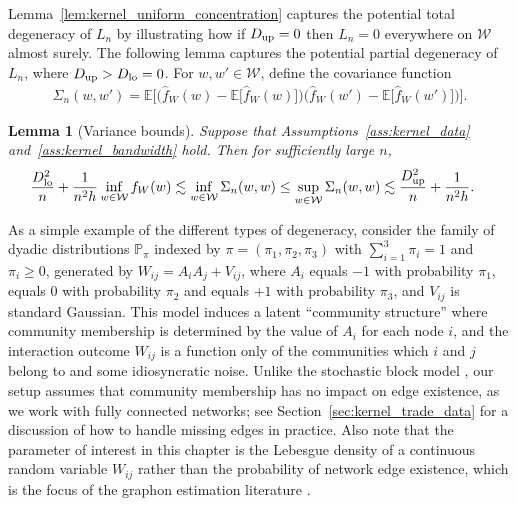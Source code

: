 \documentclass[11pt,lof]{puthesis}
\renewcommand{\P}{\ensuremath{\mathbb{P}}}
\newcommand{\E}{\ensuremath{\mathbb{E}}}
\newcommand{\cW}{\ensuremath{\mathcal{W}}}
\newcommand{\Dl}{\ensuremath{D_{\textup{lo}}}}
\newcommand{\Du}{\ensuremath{D_{\textup{up}}}}
\theoremstyle{break}
\newtheorem{lemma}{Lemma}[section]
\theoremstyle{proof}
\begin{document}
Lemma~\ref{lem:kernel_uniform_concentration} captures the potential total
degeneracy of $L_n$ by illustrating how if $\Du=0$ then $L_n=0$ everywhere on
$\cW$ almost surely. The following lemma captures the potential partial
degeneracy of $L_n$, where $\Du > \Dl = 0$. For $w,w' \in \cW$, define the
covariance function
%
\begin{align*}
  \Sigma_n(w,w') =
  \E\Big[
    \Big(
      \hat f_W(w)
      - \E\big[\hat f_W(w)\big]
    \Big)
    \Big(
      \hat f_W(w')
      - \E\big[\hat f_W(w')\big]
    \Big)
  \Big].
\end{align*}
%
\begin{lemma}[Variance bounds]
  \label{lem:kernel_variance_bounds}
  Suppose that Assumptions~\ref{ass:kernel_data} and~\ref{ass:kernel_bandwidth}
  hold. Then for sufficiently large $n$,
  \begin{align*}
    \frac{\Dl^2}{n} + \frac{1}{n^2h}
    \inf_{w \in \cW} f_W(w)
    &\lesssim
    \inf_{w \in \cW} \Sigma_n(w,w)
    \leq
    \sup_{w \in \cW} \Sigma_n(w,w)
    \lesssim
    \frac{\Du^2}{n} + \frac{1}{n^2h}.
  \end{align*}
\end{lemma}

As a simple example of the different types of degeneracy, consider the family
of dyadic distributions $\P_{\pi}$ indexed by $\pi = (\pi_1, \pi_2, \pi_3)$
with $\sum_{i=1}^3 \pi_i = 1$ and $\pi_i \geq 0$, generated by
$W_{i j} = A_i A_j + V_{i j}$, where $A_i$ equals $-1$ with probability
$\pi_1$, equals $0$ with probability $\pi_2$ and equals $+1$ with probability
$\pi_3$, and $V_{i j}$ is standard Gaussian. This model induces a latent
``community structure'' where community membership is determined by the value
of $A_i$ for each node $i$, and the interaction outcome $W_{i j}$ is a function
only of the communities which $i$ and $j$ belong to and some idiosyncratic
noise. Unlike the stochastic block model \citep{kolaczyk2009statistical}, our
setup assumes that community membership has no impact on edge existence, as we
work with fully connected networks; see Section~\ref{sec:kernel_trade_data} for
a discussion of how to handle missing edges in practice. Also note that the
parameter of interest in this chapter is the Lebesgue density of a continuous
random variable $W_{i j}$ rather than the probability of network edge existence,
which is the focus of the graphon estimation literature
\citep{gao2021minimax}.
\end{document}
